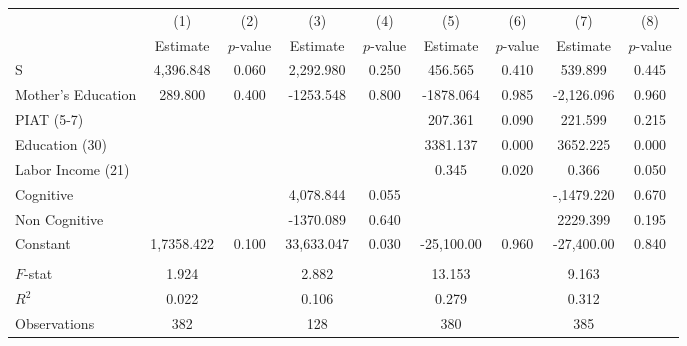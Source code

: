 \begin{tabular}{lcccccccc} \toprule
 & (1) & (2) & (3) & (4) & (5) & (6) & (7) & (8) \\ 
 & Estimate  & $p$-value  & Estimate  & $p$-value  & Estimate  & $p$-value  & Estimate  & $p$-value  \\  \midrule
S &  4,396.848 &     0.060 &  2,292.980 &     0.250 &   456.565 &     0.410 &   539.899 &     0.445 \\  
Mother's Education &   289.800 &     0.400 & -1253.548 &     0.800 & -1878.064 &     0.985 & -2,126.096 &     0.960 \\  
PIAT (5-7) &         &         &         &         &   207.361 &     0.090 &   221.599 &     0.215 \\  
Education (30) &         &         &         &         &  3381.137 &     0.000 &  3652.225 &     0.000 \\  
Labor Income (21) &         &         &         &         &     0.345 &     0.020 &     0.366 &     0.050 \\  
Cognitive &         &         &  4,078.844 &     0.055 &         &         & -,1479.220 &     0.670 \\  
Non Cognitive &         &         & -1370.089 &     0.640 &         &         &  2229.399 &     0.195 \\  
Constant & 1,7358.422 &     0.100 & 33,633.047 &     0.030 & -25,100.00 &     0.960 & -27,400.00 &     0.840 \\  \\ \midrule
$F$-stat &     1.924 &         &     2.882 &         &    13.153 &         &     9.163 &        \\ 
$R^2$ &     0.022 &         &     0.106 &         &     0.279 &         &     0.312 &        \\ 
Observations &   382 &         &   128 &         &   380 &         &   385 &        \\ 
\bottomrule \end{tabular}
